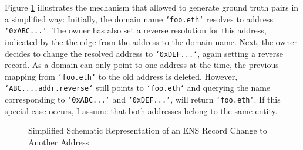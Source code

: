 \documentclass[12pt,a4paper,titlepage,oneside,english]{article}
\begin{document}
Figure \ref{fig:ENS} illustrates the mechanism that allowed to generate ground truth pairs in a simplified way: Initially, the domain name \texttt{`foo.eth`} resolves to address \texttt{`0xABC...`}. The owner has also set a reverse resolution for this address, indicated by the the edge from the address to the domain name. Next, the owner decides to change the resolved address to \texttt{`0xDEF...`}, again setting a reverse record.  As a domain can only point to one address at the time, the previous mapping from \texttt{`foo.eth`} to the old address is deleted. However, \texttt{`ABC....addr.reverse`} still points to \texttt{`foo.eth`} and querying the name corresponding to \texttt{`0xABC...`} and \texttt{`0xDEF...`}, will return \texttt{`foo.eth`}.
If this special case occurs, I assume that both addresses belong to the same entity.

\begin{figure}[h!]
	\begin{center}
		\caption{Simplified Schematic Representation of an ENS Record Change to Another Address}
		\label{fig:ENS}
	\end{center}
\end{figure}
\end{document}
